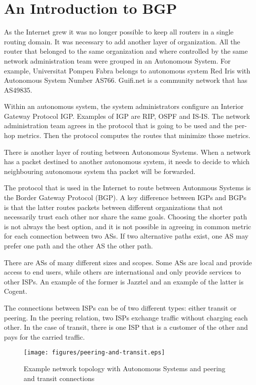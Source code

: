 \chapter{An Introduction to BGP}

As the Internet grew it was no longer possible to keep all routers in a single routing domain.
It was necessary to add another layer of organization.
All the router that belonged to the same organization and where controlled by the same network administration team were grouped in an Autonomous System.
For example, Universitat Pompeu Fabra belongs to autonomous system Red Iris with Autonomous System Number AS766.
Guifi.net is a community network that has AS49835.

Within an autonomous system, the system administrators configure an Interior Gateway Protocol IGP.
Examples of IGP are RIP, OSPF and IS-IS.
The network administration team agrees in the protocol that is going to be used and the per-hop metrics.
Then the protocol computes the routes that minimize those metrics.

There is another layer of routing between Autonomous Systems.
When a network has a packet destined to another autonomous system, it needs to decide to which neighbouring autonomous system tha packet will be forwarded.

The protocol that is used in the Internet to route between Autonmous Systems is the Border Gateway Protocol (BGP).
A key difference between IGPs and BGPs is that the latter routes packets between different organizations that not necessarily trust each other nor share the same goals.
Choosing the shorter path is not always the best option, and it is not possible in agreeing in common metric for each connection between two ASs.
If two alternative paths exist, one AS may prefer one path and the other AS the other path.

There are ASs of many different sizes and scopes.
Some ASs are local and provide access to end users, while others are international and only provide services to other ISPs.
An example of the former is Jazztel and an example of the latter is Cogent.

The connections between ISPs can be of two different types: either transit or peering.
In the peering relation, two ISPs exchange traffic without charging each other.
In the case of transit, there is one ISP that is a customer of the other and pays for the carried traffic.

\begin{figure}[!h]
\centering
\texttt{[image: figures/peering-and-transit.eps]}
\caption{Example network topology with Autonomous Systems and peering and transit connections}
\label{fig:peering-and-transit}
\end{figure}


